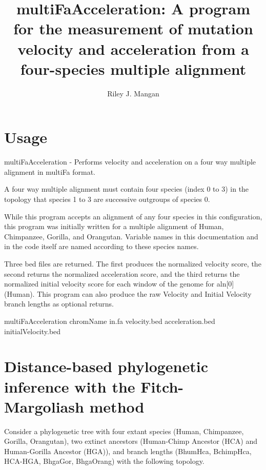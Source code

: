 \documentclass{article} %
\begin{document}
\title{multiFaAcceleration: A program for the measurement of mutation velocity and acceleration from a four-species multiple alignment}
\author{Riley J. Mangan}
\maketitle

\section{Usage}
multiFaAcceleration - Performs velocity and acceleration on a four way multiple alignment in multiFa format.\par
A four way multiple alignment must contain four species (index 0 to 3) in the topology that species 1 to 3 are successive outgroups of species 0.\par
While this program accepts an alignment of any four species in this configuration, this program was initially written for a multiple alignment of Human, Chimpanzee, Gorilla, and Orangutan. Variable names in this documentation and in the code itself are named according to these species names.\par
Three bed files are returned. The first produces the normalized velocity score, the second returns the normalized acceleration score, and the third returns the normalized initial velocity score for each window of the genome for aln[0] (Human). This program can also produce the raw Velocity and Initial Velocity branch lengths as optional returns.\par
multiFaAcceleration chromName in.fa velocity.bed acceleration.bed initialVelocity.bed\par

\section{Distance-based phylogenetic inference with the Fitch-Margoliash method}

Consider a phylogenetic tree with four extant species (Human, Chimpanzee, Gorilla, Orangutan), two extinct ancestors (Human-Chimp Ancestor (HCA) and Human-Gorilla Ancestor (HGA)), and branch lengths (BhumHca, BchimpHca, HCA-HGA, BhgaGor, BhgaOrang) with the following topology.\par

\begin{center}
\end{center}
\end{document}
